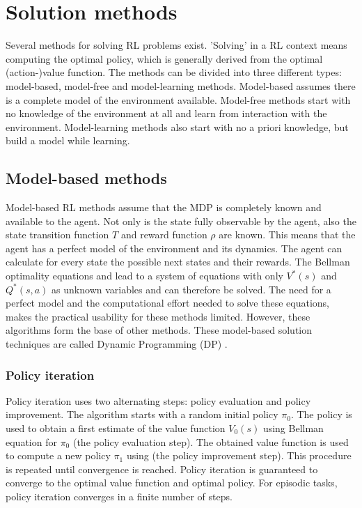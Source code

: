 \documentclass[a4paper,11pt]{mscLiterature}
\begin{document}

\chapter{Solution methods}\label{chap:solutionMethods}
Several methods for solving RL problems exist. 'Solving' in a RL context means computing the optimal policy, which is generally derived from the optimal (action-)value function. The methods can be divided into three different types: model-based, model-free and model-learning methods. Model-based assumes there is a complete model of the environment available. Model-free methods start with no knowledge of the environment at all and learn from interaction with the environment. Model-learning methods also start with no a priori knowledge, but build a model while learning.

			\section{Model-based methods}\label{sec:modelBasedSolutionMethods}
			Model-based RL methods assume that the MDP is completely known and available to the agent. Not only is the state fully observable by the agent, also the state transition function $T$ and reward function $\rho$ are known. This means that the agent has a perfect model of the environment and its dynamics. The agent can calculate for every state the possible next states and their rewards. The Bellman optimality equations  and  lead to a system of equations with only $V^*(s)$ and $Q^*(s,a)$ as unknown variables and can therefore be solved. The need for a perfect model and the computational effort needed to solve these equations, makes the practical usability for these methods limited. However, these algorithms form the base of other methods. These model-based solution techniques are called Dynamic Programming (DP) \cite{Bellman:57}.
			
			\subsection{Policy iteration}
			Policy iteration uses two alternating steps: policy evaluation and policy improvement. The algorithm starts with a random initial policy $\pi_0$. The policy is used to obtain a first estimate of the value function $V_0(s)$ using Bellman equation  for $\pi_0$ (the policy evaluation step). The obtained value function is used to compute a new policy $\pi_1$ using  (the policy improvement step). This procedure is repeated until convergence is reached. Policy iteration is guaranteed to converge to the optimal value function and optimal policy. For episodic tasks, policy iteration converges in a finite number of steps.
			
\end{document}
